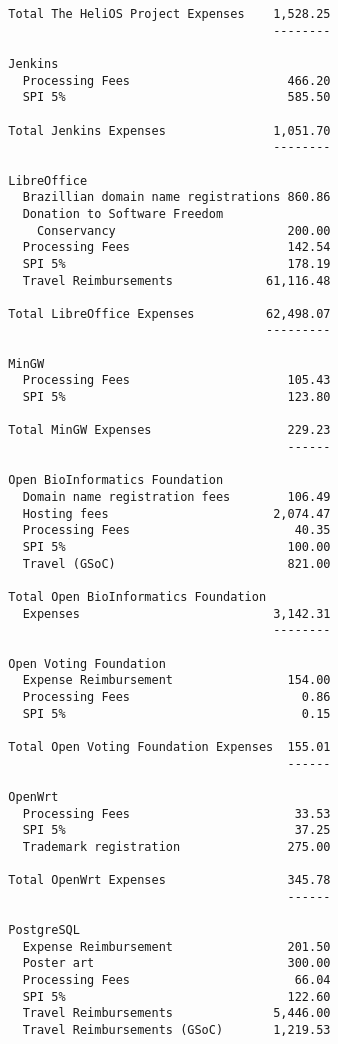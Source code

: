 \documentclass[letterpaper]{report}
\begin{document}
\begin{verbatim}
  Total The HeliOS Project Expenses    1,528.25
                                       --------

  Jenkins
    Processing Fees                      466.20
    SPI 5%                               585.50

  Total Jenkins Expenses               1,051.70
                                       --------

  LibreOffice
    Brazillian domain name registrations 860.86
    Donation to Software Freedom
      Conservancy                        200.00
    Processing Fees                      142.54
    SPI 5%                               178.19
    Travel Reimbursements             61,116.48

  Total LibreOffice Expenses          62,498.07
                                      ---------

  MinGW
    Processing Fees                      105.43
    SPI 5%                               123.80

  Total MinGW Expenses                   229.23
                                         ------

  Open BioInformatics Foundation
    Domain name registration fees        106.49
    Hosting fees                       2,074.47
    Processing Fees                       40.35
    SPI 5%                               100.00
    Travel (GSoC)                        821.00

  Total Open BioInformatics Foundation
    Expenses                           3,142.31
                                       --------

  Open Voting Foundation
    Expense Reimbursement                154.00
    Processing Fees                        0.86
    SPI 5%                                 0.15

  Total Open Voting Foundation Expenses  155.01
                                         ------

  OpenWrt
    Processing Fees                       33.53
    SPI 5%                                37.25
    Trademark registration               275.00

  Total OpenWrt Expenses                 345.78
                                         ------

  PostgreSQL
    Expense Reimbursement                201.50
    Poster art                           300.00
    Processing Fees                       66.04
    SPI 5%                               122.60
    Travel Reimbursements              5,446.00
    Travel Reimbursements (GSoC)       1,219.53


\end{verbatim}
\end{document}
